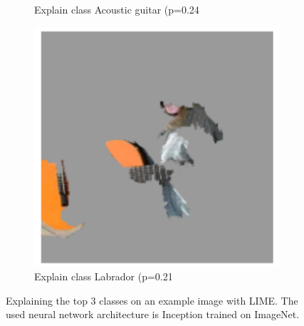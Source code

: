 \begin{figure}[H]
\begin{subfigure}[t]{.23\textwidth}
        \caption{Explain class Acoustic guitar (p=0.24}
    \end{subfigure}\hfill%
    \begin{subfigure}[t]{.23\textwidth}
        \centering
        \includegraphics[width=\linewidth]{chapters/02_methods/images/lime_dog_3.png}
        \caption{Explain class Labrador (p=0.21}
    \end{subfigure}
    \caption{Explaining the top 3 classes on an example image with LIME. The used neural network architecture is Inception trained on ImageNet.\cite{ribeiro2016should}}
    \label{lime_dog}
\end{figure}
